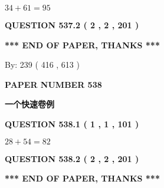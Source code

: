 \documentclass{ctexart}
\begin{document}
  
 
 

$ %
34 +  %
61=   %
95$
 
 
  
\vspace{0.2in}
  
{\textbf{\Large{QUESTION
537.2 
 ( 2 , 2 , 201 )
}}}
  
  
   
   
 \vspace{0.2in}
 
   
   
   
   
\vspace{1.0in} 
{\textbf{\large{ *** END OF PAPER, THANKS *** }}} 
   
   
\hspace{1.0in} By: 
 239 ( 416 ,  613 )
   
   
   
   
\newpage 
\setcounter{page}{ 
   538001 } 
   
   
   
   
 {\textbf{ \Large{ PAPER NUMBER  538  }}}
   
   
\vspace{0.2in}
   
   
   
   
   
   
 \vspace{0.2in}
{\LARGE {\textbf{ 一个快速卷例}}}
   
   
  
\vspace{0.2in}
  
{\textbf{\Large{QUESTION
538.1 
 ( 1 , 1 , 101 )
}}}
  
  
 
 

$ %
28 +  %
54=   %
82$
 
 
  
\vspace{0.2in}
  
{\textbf{\Large{QUESTION
538.2 
 ( 2 , 2 , 201 )
}}}
  
  
   
   
 \vspace{0.2in}
 
   
   
   
   
\vspace{1.0in} 
{\textbf{\large{ *** END OF PAPER, THANKS *** }}} 
   
\end{document}

